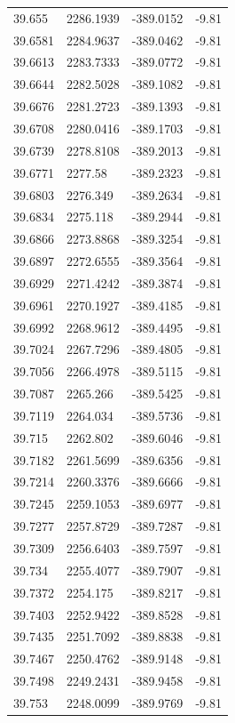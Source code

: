 \begin{table}[H]
\begin{tabular}{llll}
39.655 & 2286.1939 & -389.0152 & -9.81 \\
39.6581 & 2284.9637 & -389.0462 & -9.81 \\
39.6613 & 2283.7333 & -389.0772 & -9.81 \\
39.6644 & 2282.5028 & -389.1082 & -9.81 \\
39.6676 & 2281.2723 & -389.1393 & -9.81 \\
39.6708 & 2280.0416 & -389.1703 & -9.81 \\
39.6739 & 2278.8108 & -389.2013 & -9.81 \\
39.6771 & 2277.58 & -389.2323 & -9.81 \\
39.6803 & 2276.349 & -389.2634 & -9.81 \\
39.6834 & 2275.118 & -389.2944 & -9.81 \\
39.6866 & 2273.8868 & -389.3254 & -9.81 \\
39.6897 & 2272.6555 & -389.3564 & -9.81 \\
39.6929 & 2271.4242 & -389.3874 & -9.81 \\
39.6961 & 2270.1927 & -389.4185 & -9.81 \\
39.6992 & 2268.9612 & -389.4495 & -9.81 \\
39.7024 & 2267.7296 & -389.4805 & -9.81 \\
39.7056 & 2266.4978 & -389.5115 & -9.81 \\
39.7087 & 2265.266 & -389.5425 & -9.81 \\
39.7119 & 2264.034 & -389.5736 & -9.81 \\
39.715 & 2262.802 & -389.6046 & -9.81 \\
39.7182 & 2261.5699 & -389.6356 & -9.81 \\
39.7214 & 2260.3376 & -389.6666 & -9.81 \\
39.7245 & 2259.1053 & -389.6977 & -9.81 \\
39.7277 & 2257.8729 & -389.7287 & -9.81 \\
39.7309 & 2256.6403 & -389.7597 & -9.81 \\
39.734 & 2255.4077 & -389.7907 & -9.81 \\
39.7372 & 2254.175 & -389.8217 & -9.81 \\
39.7403 & 2252.9422 & -389.8528 & -9.81 \\
39.7435 & 2251.7092 & -389.8838 & -9.81 \\
39.7467 & 2250.4762 & -389.9148 & -9.81 \\
39.7498 & 2249.2431 & -389.9458 & -9.81 \\
39.753 & 2248.0099 & -389.9769 & -9.81 \\

\end{tabular}
\end{table}

